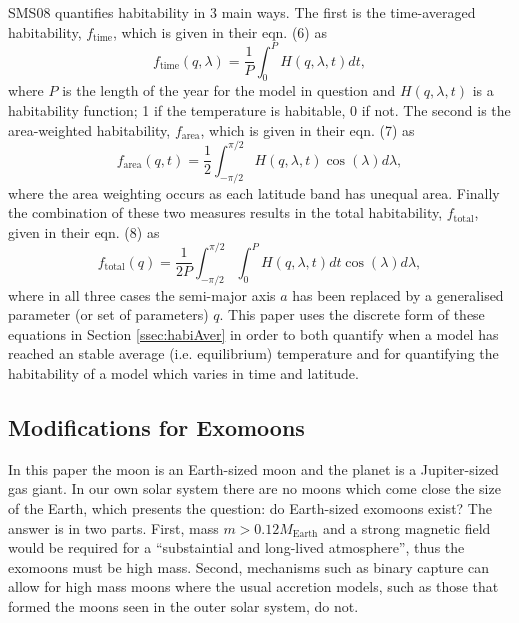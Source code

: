\documentclass[12pt, onecolumn]{revtex4-2}    %
\begin{document}
SMS08 quantifies habitability in 3 main ways.
The first is the time-averaged habitability, $f_\text{time}$, which is given in their eqn. (6) as
\begin{equation}
  f_\text{time}(q, \lambda) = \frac{1}{P} \int_{0}^{P} H(q, \lambda, t) dt,
  \label{eqn:timeaverage}
\end{equation}
where $P$ is the length of the year for the model in question and $H(q, \lambda, t)$ is a habitability function; 1 if the temperature is habitable, 0 if not.
The second is the area-weighted habitability, $f_\text{area}$, which is given in their eqn. (7) as
\begin{equation}
  f_\text{area}(q, t) = \frac{1}{2} \int_{-\pi/2}^{\pi/2} H(q, \lambda, t) \cos(\lambda)d\lambda,
  \label{eqn:areaaverage}
\end{equation}
where the area weighting occurs as each latitude band has unequal area.
Finally the combination of these two measures results in the total habitability, $f_\text{total}$, given in their eqn. (8) as
\begin{equation}
  f_\text{total}(q) = \frac{1}{2P} \int_{-\pi/2}^{\pi/2} \int_{0}^{P} H(q, \lambda, t) dt \cos(\lambda)d\lambda,
  \label{eqn:totalaverage}
\end{equation}
where in all three cases the semi-major axis $a$ has been replaced by a generalised parameter (or set of parameters) $q$.
This paper uses the discrete form of these equations in Section \ref{ssec:habiAver} in order to both quantify when a model has reached an stable average (i.e. equilibrium) temperature and for quantifying the habitability of a model which varies in time and latitude.

\subsection{Modifications for Exomoons} \label{ssec:ModificationsForExomoons}
In this paper the moon is an Earth-sized moon and the planet is a Jupiter-sized gas giant.
In our own solar system there are no moons which come close the size of the Earth, which presents the question: do Earth-sized exomoons exist?
The answer is in two parts.
First, mass $m > 0.12 M_\text{Earth}$ and a strong magnetic field \cite{WKW1997} would be required for a ``substaintial and long-lived atmosphere'', thus the exomoons must be high mass.
Second, mechanisms such as binary capture \cite{Williams2013} can allow for high mass moons where the usual accretion models, such as those that formed the moons seen in the outer solar system, do not. 
\end{document}
